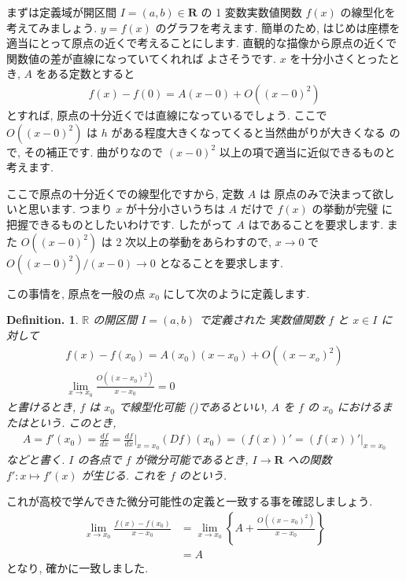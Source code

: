 \documentclass[openany, a4paper, oneside]{jsbook}
\theoremstyle{break}
\theoremstyle{breakdefn}
\newtheorem{defn}[thm]{Definition.}
\newcommand{\bbR}{\mathbb{R}}
\begin{document}
まずは定義域が開区間 $I =(a,b) \in \bm{R}$ の 1 変数実数値関数
 $f (x)$ の線型化を考えてみましょう.
 $y=f (x)$ のグラフを考えます.
簡単のため, はじめは座標を適当にとって原点の近くで考えることにします.
直観的な描像から原点の近くで関数値の差が直線になっていてくれれば
よさそうです.  $x$ を十分小さくとったとき,  $A$ をある定数とすると
    \begin{align}
        f (x) - f (0) = A (x-0) + O\left ( (x-0)^2 \right)
    \end{align}
とすれば, 原点の十分近くでは直線になっているでしょう.
ここで $O\left ( (x-0)^2 \right)$ は $h$ がある程度大きくなってくると当然曲がりが大きくなる
ので, その補正です. 曲がりなので $(x-0)^2$ 以上の項で適当に近似できるものと考えます.

ここで原点の十分近くでの線型化ですから, 定数 $A$ は
原点のみで決まって欲しいと思います.
つまり $x$ が十分小さいうちは $A$ だけで $f (x)$ の挙動が完璧
に把握できるものとしたいわけです.
したがって $A$ はであることを要求します.
また $O\left ( (x-0)^2 \right)$ は 2 次以上の挙動をあらわすので,  $x \rightarrow 0$ で
 $O\left ( (x-0)^2 \right) / (x-0) \rightarrow 0$ となることを要求します.

この事情を, 原点を一般の点 $x_0$ にして次のように定義します.
    \begin{defn} $\bbR$ の開区間 $I=(a,b)$ で定義された
実数値関数 $f$ と $x \in I$ に対して
    \begin{gather}
        f (x) - f (x_0) = A (x_0) (x-x_0) + O\left ( (x-x_o)^2 \right) \\
        \lim_{x \to x_0}\frac{O\left ( (x-x_0)^2 \right) }{x-x_0}=0
    \end{gather}
と書けるとき,  $f$ は $x_0$ で線型化可能 ()であるといい,
 $A$ を $f$ の $x_0$ におけるまたはという.
このとき,
    \begin{align}       A=f'(x_0)=\frac{df}{dx}=\frac{df}{dx} \Big|_{x=x_0}
        (Df) (x_0)=\left ( f (x) \right) ' =
        \left ( f (x) \right) ' \big|_{x=x_0}
    \end{align}
などと書く.  $I$ の各点で $f$ が微分可能であるとき,  $I \to \bm{R}$ への関数
 $f':x \mapsto f'(x)$ が生じる. これを $f$ のという.
\end{defn}

これが高校で学んできた微分可能性の定義と一致する事を確認しましょう.
    \begin{align}
        \lim_{x \to x_0}\frac{ f (x) - f (x_0) }{x-x_0} &=\lim_{x \to x_0}
        \left \{ A + \frac{O\left ( (x-x_0)^2 \right) }{x-x_0} \right \}\\
            &=A
    \end{align}
となり, 確かに一致しました.
\end{document}
